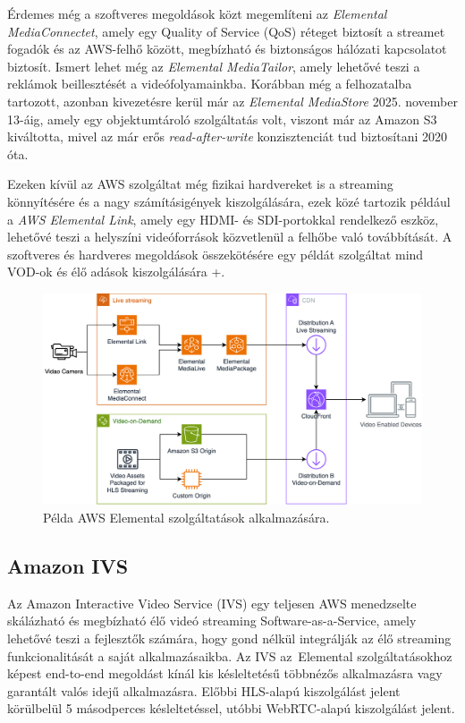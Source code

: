 Érdemes még a szoftveres megoldások közt megemlíteni az \emph{Elemental MediaConnectet}, amely egy Quality of Service (QoS) réteget biztosít a streamet fogadók és az AWS-felhő között, megbízható és biztonságos hálózati kapcsolatot biztosít. Ismert lehet még az \emph{Elemental MediaTailor}, amely lehetővé teszi a reklámok beillesztését a videófolyamainkba. Korábban még a felhozatalba tartozott, azonban kivezetésre kerül már az \emph{Elemental MediaStore} 2025. november 13-áig, amely egy objektumtároló szolgáltatás volt, viszont már az Amazon S3 kiváltotta, mivel az már erős \emph{read-after-write} konzisztenciát tud biztosítani 2020 óta.\cite{Mediastore}

Ezeken kívül az AWS szolgáltat még fizikai hardvereket is a streaming könnyítésére és a nagy számításigények kiszolgálására, ezek közé tartozik például a \emph{AWS Elemental Link}, amely egy HDMI- és SDI-portokkal rendelkező eszköz, lehetővé teszi a helyszíni videóforrások közvetlenül a felhőbe való továbbítását. A szoftveres és hardveres megoldások összekötésére egy példát szolgáltat mind VOD-ok és élő adások kiszolgálására \az+.

\begin{figure}
	\centering
	\includegraphics[width=150mm, keepaspectratio]{figures/dipterv_vodlive.png}
	\caption{Példa AWS Elemental szolgáltatások alkalmazására.}
	\label{fig:vodlive}
\end{figure}

\subsection{Amazon IVS}

Az Amazon Interactive Video Service (IVS) egy teljesen AWS menedzselte skálázható és megbízható élő videó streaming Software-as-a-Service, amely lehetővé teszi a fejlesztők számára, hogy gond nélkül integrálják az élő streaming funkcionalitását a saját alkalmazásaikba. Az IVS az~Elemental szolgáltatásokhoz képest end-to-end megoldást kínál kis késleltetésű többnézős alkalmazásra vagy garantált valós idejű alkalmazásra. Előbbi HLS-alapú kiszolgálást jelent körülbelül 5 másodperces késleltetéssel, utóbbi WebRTC-alapú kiszolgálást jelent.\cite{Ivs}

